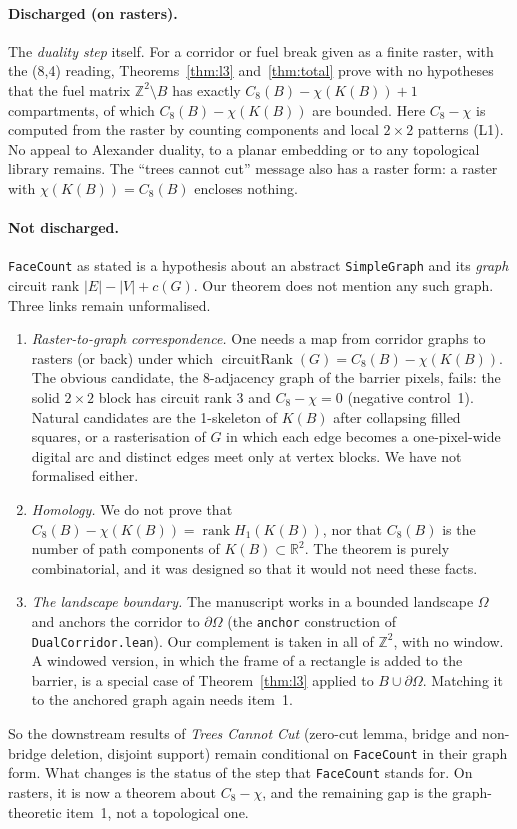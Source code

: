 \documentclass[11pt]{article}
\theoremstyle{definition}
\theoremstyle{remark}
\begin{document}
\paragraph{Discharged (on rasters).} The \emph{duality step} itself. For a corridor or
fuel break given as a finite raster, with the (8,4) reading, Theorems~\ref{thm:l3}
and~\ref{thm:total} prove with no hypotheses that the fuel matrix $\mathbb{Z}^2\setminus B$
has exactly $C_8(B)-\chi(K(B))+1$ compartments, of which $C_8(B)-\chi(K(B))$ are bounded.
Here $C_8-\chi$ is computed from the raster by counting components and local
$2\times 2$ patterns (L1). No appeal to Alexander duality, to a planar embedding or to
any topological library remains. The ``trees cannot cut'' message also has a raster
form: a raster with $\chi(K(B))=C_8(B)$ encloses nothing.

\paragraph{Not discharged.} \texttt{FaceCount} as stated is a hypothesis about an
abstract \texttt{SimpleGraph} and its \emph{graph} circuit rank $|E|-|V|+c(G)$. Our
theorem does not mention any such graph. Three links remain unformalised.
\begin{enumerate}
\item \emph{Raster-to-graph correspondence.} One needs a map from corridor graphs to
  rasters (or back) under which $\operatorname{circuitRank}(G)=C_8(B)-\chi(K(B))$. The obvious
  candidate, the 8-adjacency graph of the barrier pixels, fails: the solid $2\times2$ block
  has circuit rank $3$ and $C_8-\chi=0$ (negative control~1). Natural candidates are
  the 1-skeleton of $K(B)$ after collapsing filled squares, or a rasterisation of $G$ in which
  each edge becomes a one-pixel-wide digital arc and distinct edges meet only at vertex
  blocks. We have not formalised either.
\item \emph{Homology.} We do not prove that $C_8(B)-\chi(K(B))=\operatorname{rank}H_1(K(B))$,
  nor that $C_8(B)$ is the number of path components of $K(B)\subset\mathbb{R}^2$. The theorem is
  purely combinatorial, and it was designed so that it would not need these facts.
\item \emph{The landscape boundary.} The manuscript works in a bounded landscape $\Omega$
  and anchors the corridor to $\partial\Omega$ (the \texttt{anchor} construction of
  \texttt{DualCorridor.lean}). Our complement is taken in all of $\mathbb{Z}^2$, with no
  window. A windowed version, in which the frame of a rectangle is added to the barrier, is
  a special case of Theorem~\ref{thm:l3} applied to $B\cup\partial\Omega$. Matching it to the
  anchored graph again needs item~1.
\end{enumerate}
So the downstream results of \emph{Trees Cannot Cut} (zero-cut lemma, bridge and
non-bridge deletion, disjoint support) remain conditional on \texttt{FaceCount} in their
graph form. What changes is the status of the step that \texttt{FaceCount} stands for. On
rasters, it is now a theorem about $C_8-\chi$, and the remaining gap is the graph-theoretic
item~1, not a topological one.
\end{document}
